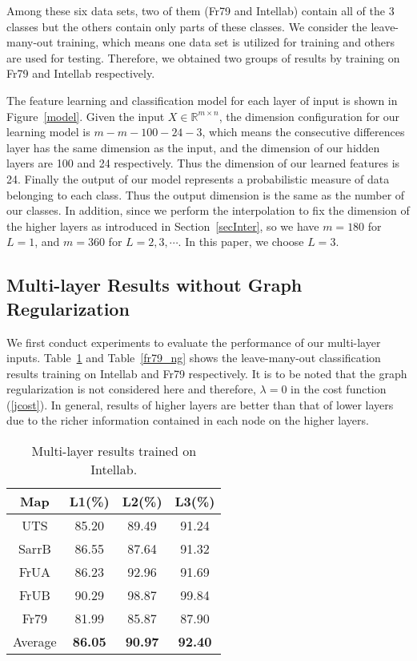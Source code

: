 \documentclass[letterpaper, 10 pt, conference]{ieeeconf}  %
\begin{document}
Among these six data sets, two of them (Fr79 and Intellab) contain all of the 3 classes but the others contain only parts of these classes. We consider the leave-many-out training, which means one data set is utilized for training and others are used for testing. Therefore, we obtained two groups of results by training on Fr79 and Intellab respectively.

The feature learning and classification model for each layer of input is shown in Figure~\ref{model}. Given the input $X\in \mathbb{R}^{m\times n}$, the dimension configuration for our learning model is $m-m-100-24-3$, which means the consecutive differences layer has the same dimension as the input, and the dimension of our hidden layers are 100 and 24 respectively. Thus the dimension of our learned features is 24. Finally the output of our model represents a probabilistic measure of data belonging to each class. Thus the output dimension is the same as the number of our classes. In addition, since we perform the interpolation to fix the dimension of the higher layers as introduced in Section~\ref{secInter}, so we have $m=180$ for $L=1$, and $m=360$ for $L=2,3,\cdots$. In this paper, we choose $L=3$.

\subsection{Multi-layer Results without Graph Regularization}

We first conduct experiments to evaluate the performance of our multi-layer inputs. Table~\ref{intel_ng} and Table~\ref{fr79_ng} shows the leave-many-out classification results training on Intellab and Fr79 respectively. It is to be noted that the graph regularization is not considered here and therefore, $\lambda=0$ in the cost function (\ref{jcost}). In general, results of higher layers are better than that of lower layers due to the richer information contained in each node on the higher layers.

\begin{table}[tpb]
\caption{Multi-layer results trained on Intellab.}
\label{intel_ng}
\begin{center}
\begin{tabular}{cccc}
Map     &L1(\%)     &L2(\%)     &L3(\%)   \\
\hline
UTS     &85.20 	    &89.49      &91.24\\
SarrB   &86.55 	    &87.64      &91.32\\
FrUA    &86.23 	    &92.96      &91.69\\
FrUB    &90.29      &98.87      &99.84\\
Fr79    &81.99      &85.87      &87.90\\
Average     &\textbf{86.05}      &\textbf{90.97}      &\textbf{92.40}\\
\end{tabular}
\end{center}
\end{table}
\end{document}
